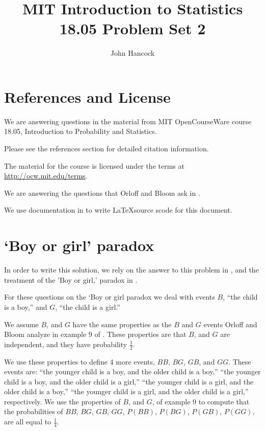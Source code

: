 \documentclass[a4paper,11pt]{article}
\author{John Hancock}
\title{MIT Introduction to Statistics 18.05 Problem Set 2 }
\begin{document}
\maketitle
\tableofcontents
\section{References and License}
We are answering questions in the material from MIT OpenCourseWare
course 18.05, Introduction to Probability and Statistics.

Please see the references section for detailed citation information.

The material for the course is licensed under the terms at 
\url{http://ocw.mit.edu/terms}.

We are answering the questions that Orloff and Bloom ask in
\cite{probSet2}.

We use documentation in \cite{latexSpecialChars} \cite{latexCases} to 
write \LaTeX source scode for this document.

\section{`Boy or girl' paradox}

In order to write this solution, we rely on the answer to this problem
in \cite{probSet2Ans}, and the treatment of the 'Boy or girl,' paradox
in \cite{boyGirlWiki}.

For these questions on the `Boy or girl paradox we deal with events
$B$, ``the child is a boy,'' and $G$, ``the child is a girl.''

We assume $B$, and $G$ have the same properties as the $B$ and $G$
events Orloff and Bloom analyze in example 9 of \cite{reading4}.
These properties are that $B$, and $G$ are independent, and they have
probability $\frac{1}{2}$.

We use these properties to define 4 more events, $BB$, $BG$, $GB$,
and $GG$.  These events are: ``the younger child is a boy, and the older
child is a boy,'' ``the younger child is a boy, and the older child is a
girl,'' ``the younger child is a girl, and the older child is a boy,''
``the younger child is a girl, and the older child is a girl,'' 
respectively.  We use the properties of $B$, and $G$, of example 9 to
compute that the probabilities of $BB$, $BG$, $GB$, $GG$, 
$P\left( BB \right)$, $P\left( BG \right)$, $P\left( GB \right)$, 
$P\left( GG \right)$, are all equal to $\frac{1}{4}$.
\end{document}
